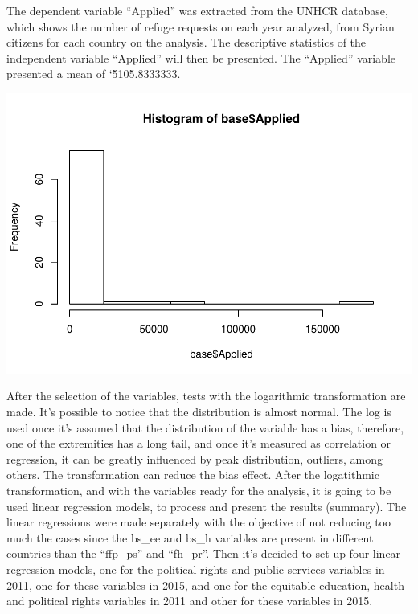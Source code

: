 \documentclass[]{elsarticle} %
\makeatletter
\def\maxwidth{\ifdim\Gin@nat@width>\linewidth\linewidth
\else\Gin@nat@width\fi}
\let\Oldincludegraphics\includegraphics
\renewcommand{\includegraphics}[1]{\Oldincludegraphics[width=\maxwidth]{#1}}
\makeatother
\begin{document}
The dependent variable ``Applied'' was extracted from the UNHCR
database, which shows the number of refuge requests on each year
analyzed, from Syrian citizens for each country on the analysis. The
descriptive statistics of the independent variable ``Applied'' will then
be presented. The ``Applied'' variable presented a mean of
`5105.8333333.

\includegraphics{refugees-stephanie_files/figure-latex/histo_1-1.pdf}

After the selection of the variables, tests with the logarithmic
transformation are made. It's possible to notice that the distribution
is almost normal. The log is used once it's assumed that the
distribution of the variable has a bias, therefore, one of the
extremities has a long tail, and once it's measured as correlation or
regression, it can be greatly influenced by peak distribution, outliers,
among others. The transformation can reduce the bias effect. After the
logatithmic transformation, and with the variables ready for the
analysis, it is going to be used linear regression models, to process
and present the results (summary). The linear regressions were made
separately with the objective of not reducing too much the cases since
the bs\_ee and bs\_h variables are present in different countries than
the ``ffp\_ps'' and ``fh\_pr''. Then it's decided to set up four linear
regression models, one for the political rights and public services
variables in 2011, one for these variables in 2015, and one for the
equitable education, health and political rights variables in 2011 and
other for these variables in 2015.
\end{document}
